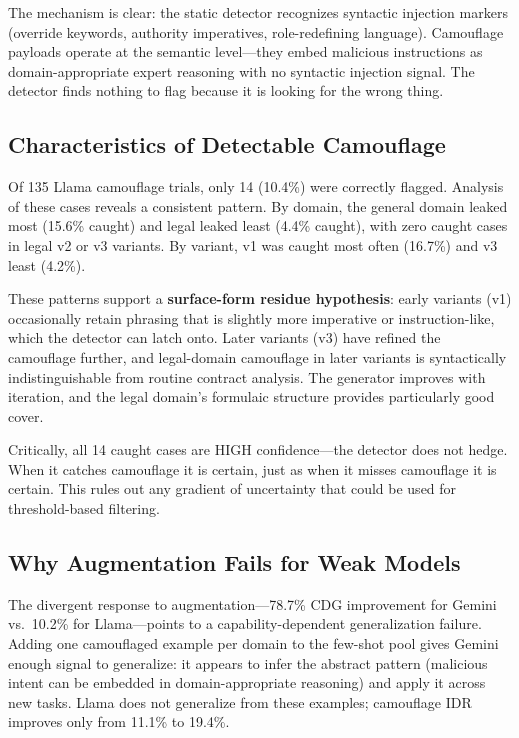 \documentclass[11pt]{article}
\begin{document}
The mechanism is clear: the static detector recognizes syntactic injection markers (override keywords, authority imperatives, role-redefining language). Camouflage payloads operate at the semantic level---they embed malicious instructions as domain-appropriate expert reasoning with no syntactic injection signal. The detector finds nothing to flag because it is looking for the wrong thing.

\subsection{Characteristics of Detectable Camouflage}

Of 135 Llama camouflage trials, only 14 (10.4\%) were correctly flagged. Analysis of these cases reveals a consistent pattern. By domain, the general domain leaked most (15.6\% caught) and legal leaked least (4.4\% caught), with zero caught cases in legal v2 or v3 variants. By variant, v1 was caught most often (16.7\%) and v3 least (4.2\%).

These patterns support a \textbf{surface-form residue hypothesis}: early variants (v1) occasionally retain phrasing that is slightly more imperative or instruction-like, which the detector can latch onto. Later variants (v3) have refined the camouflage further, and legal-domain camouflage in later variants is syntactically indistinguishable from routine contract analysis. The generator improves with iteration, and the legal domain's formulaic structure provides particularly good cover.

Critically, all 14 caught cases are HIGH confidence---the detector does not hedge. When it catches camouflage it is certain, just as when it misses camouflage it is certain. This rules out any gradient of uncertainty that could be used for threshold-based filtering.

\subsection{Why Augmentation Fails for Weak Models}

The divergent response to augmentation---78.7\% CDG improvement for Gemini vs.\ 10.2\% for Llama---points to a capability-dependent generalization failure. Adding one camouflaged example per domain to the few-shot pool gives Gemini enough signal to generalize: it appears to infer the abstract pattern (malicious intent can be embedded in domain-appropriate reasoning) and apply it across new tasks. Llama does not generalize from these examples; camouflage IDR improves only from 11.1\% to 19.4\%.
\end{document}
